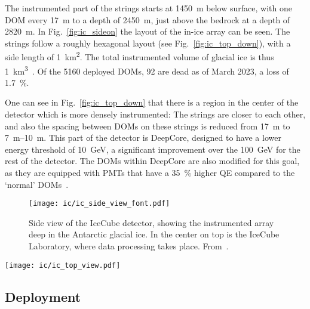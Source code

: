 The instrumented part of the strings starts at \SI{1450}{\m} below surface, with one DOM every \SI{17}{\m} to a depth of \SI{2450}{\m}, just above the bedrock at a depth of \SI{2820}{\m}. In Fig.~\ref{fig:ic_sideon} the layout of the in-ice array can be seen. The strings follow a roughly hexagonal layout (see Fig.~\ref{fig:ic_top_down}), with a side length of \SI{1}{\km\squared}. The total instrumented volume of glacial ice is thus \SI{1}{\km\cubed}~\cite{Aartsen2017}. Of the 5160 deployed DOMs, 92 are dead as of March 2023, a loss of \SI{1.7}{\percent}.

One can see in Fig.~\ref{fig:ic_top_down} that there is a region in the center of the detector which is more densely instrumented: The strings are closer to each other, and also the spacing between DOMs on these strings is reduced from \SI{17}{\m} to \SIrange{7}{10}{\m}. This part of the detector is DeepCore, designed to have a lower energy threshold of \SI{10}{\GeV}, a significant improvement over the \SI{100}{\GeV} for the rest of the detector. The DOMs within DeepCore are also modified for this goal, as they are equipped with PMTs that have a \SI{35}{\percent} higher QE compared to the `normal' DOMs~\cite{Aartsen2017}.

\begin{figure}[htbp]
    \texttt{[image: ic/ic\_side\_view\_font.pdf]}
    \caption[IceCube side-on]{Side view of the IceCube detector, showing the instrumented array deep in the Antarctic glacial ice. In the center on top is the IceCube Laboratory, where data processing takes place. From~\cite{Ahlers2018a}.}
\end{figure}

\begin{marginfigure}
    \texttt{[image: ic/ic\_top\_view.pdf]}
    \caption[IceCube top-down view]{Top-down view of the IceCube detector, spanning \SI{1}{\square\km} on the surface. From~\cite{Ahlers2018a}.}
\end{marginfigure}

\subsection{Deployment}

